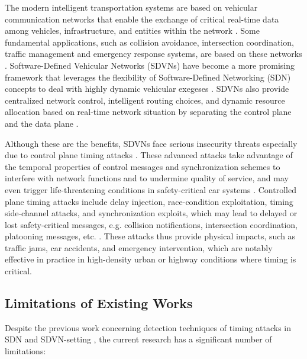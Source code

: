 The modern intelligent transportation systems are based on vehicular communication networks that enable the exchange of critical real-time data among vehicles, infrastructure, and entities within the network \cite{hartenstein2008tutorial}. Some fundamental applications, such as collision avoidance, intersection coordination, traffic management and emergency response systems, are based on these networks \cite{islam2021software}. Software-Defined Vehicular Networks (SDVNs) have become a more promising framework that leverages the flexibility of Software-Defined Networking (SDN) concepts to deal with highly dynamic vehicular exegeses \cite{cardona2020software, mekki2021software}. SDVNs also provide centralized network control, intelligent routing choices, and dynamic resource allocation based on real-time network situation by separating the control plane and the data plane \cite{malakar2024survey, abugabah2020intelligent}.

Although these are the benefits, SDVNs face serious insecurity threats especially due to control plane timing attacks \cite{Shoaib2021Timing, Arif2019Timing}. These advanced attacks take advantage of the temporal properties of control messages and synchronization schemes to interfere with network functions and to undermine quality of service, and may even trigger life-threatening conditions in safety-critical car systems \cite{Xu2015Race, Cao2018CrossPath}. Controlled plane timing attacks include delay injection, race-condition exploitation, timing side-channel attacks, and synchronization exploits, which may lead to delayed or lost safety-critical messages, e.g. collision notifications, intersection coordination, platooning messages, etc. \cite{Arif2019Timing}. These attacks thus provide physical impacts, such as traffic jams, car accidents, and emergency intervention, which are notably effective in practice in high-density urban or highway conditions where timing is critical.

\subsection{Limitations of Existing Works}

Despite the previous work concerning detection techniques of timing attacks in SDN and SDVN-setting \cite{Shoaib2023Detection}, the current research has a significant number of limitations:

